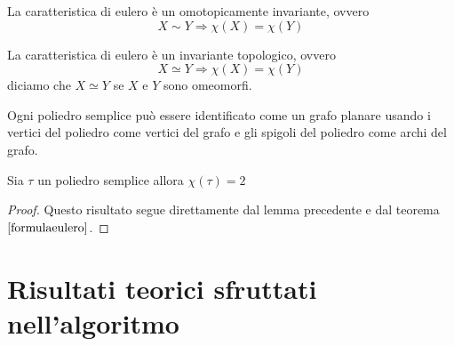 \begin{lemma}\label{om-inv}
    La caratteristica di eulero è un omotopicamente invariante, ovvero
    \begin{equation}
        X \sim Y \Rightarrow \chi (X) = \chi (Y)
    \end{equation}
\end{lemma}

\begin{proposizione}\label{inv-top}
    La caratteristica di eulero è un invariante topologico, ovvero
    \begin{equation}
        X \simeq Y \Rightarrow \chi (X) = \chi (Y)
    \end{equation}
    diciamo che \(X \simeq Y\) se \(X\) e \(Y\) sono omeomorfi.
\end{proposizione}

\begin{lemma}
    Ogni poliedro semplice può essere identificato come un grafo planare usando i vertici del poliedro come vertici del grafo e gli spigoli del poliedro come archi del grafo.
\end{lemma}
\begin{proposizione}
    Sia \(\tau\) un poliedro semplice allora \(\chi(\tau)=2\)
    \begin{proof}
        Questo risultato segue direttamente dal lemma precedente e dal teorema \(\ref{formulaeulero}\).
    \end{proof}
\end{proposizione}

\section{Risultati teorici sfruttati nell'algoritmo}

